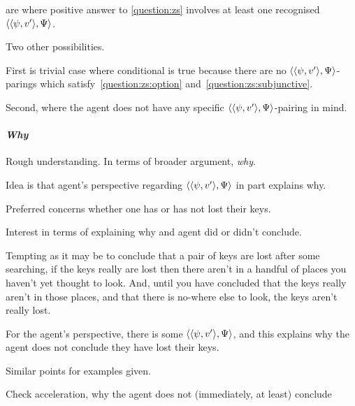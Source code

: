 \begin{note}
   are where positive answer to \autoref{question:zs} involves at least one recognised \(\langle \langle \psi, v' \rangle, \Psi \rangle\).

  Two other possibilities.

  First is trivial case where conditional is true because there are no \(\langle \langle \psi, v' \rangle, \Psi \rangle\)-parings which satisfy~\ref{question:zs:option} and~\ref{question:zs:subjunctive}.

  Second, where the agent does not have any specific \(\langle \langle \psi, v' \rangle, \Psi \rangle\)-pairing in mind.
\end{note}

\paragraph{\emph{Why}}

\begin{note}
  Rough understanding.
  In terms of broader argument, \emph{why}.

  Idea is that agent's perspective regarding \(\langle \langle \psi, v' \rangle, \Psi \rangle\) in part explains why.

  Preferred  concerns whether one has or has not lost their keys.
\end{note}

\begin{note}
  {
    \color{red}
    Interest in terms of explaining why and agent did or didn't conclude.
  }

  \begin{illustration}
    Tempting as it may be to conclude that a pair of keys are lost after some searching, if the keys really are lost then there aren't in a handful of places you haven't yet thought to look. And, until you have concluded that the keys really aren't in those places, and that there is no-where else to look, the keys aren't really lost.
  \end{illustration}

  For the agent's perspective, there is some \(\langle \langle \psi, v' \rangle, \Psi \rangle\), and this explains why the agent does not conclude they have lost their keys.
\end{note}

\begin{note}
  Similar points for examples given.

  Check acceleration, why the agent does not (immediately, at least) conclude 
\end{note}

